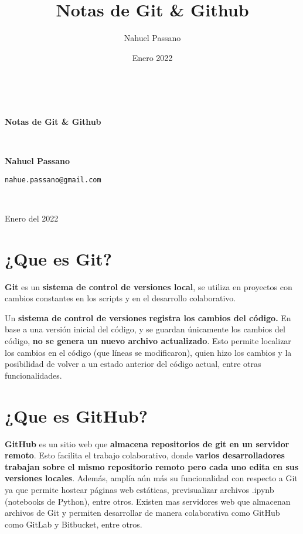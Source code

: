 \documentclass[11pt, twoside]{article}
\title{Notas de Git \& Github}
\author{Nahuel Passano}
\date{Enero 2022}
\begin{document}
\begin{titlepage}
\author{}
\date{}

\centering

~
\vspace{2cm}
~


\vspace{1cm}


\vspace{4cm}
\color{Blue}
{\Huge \bfseries Notas de Git \& Github\par}
\color{Black}
~

{\bfseries\LARGE Nahuel Passano  \par}
{ \texttt{nahue.passano@gmail.com}}

~
\vspace{4cm}
~

\vfill


{\large Enero del 2022\par}
\end{titlepage}
\section{¿Que es Git?}

\textbf{Git} es un \textbf{sistema de control de versiones local}, se utiliza en proyectos con cambios constantes en los scripts y en el desarrollo colaborativo. 

Un \textbf{sistema de control de versiones} \textbf{registra los cambios del código.} En base a una versión inicial del código, y se guardan únicamente los cambios del código, \textbf{no se genera un nuevo archivo actualizado}. Esto permite localizar los cambios en el código (que líneas se modificaron), quien hizo los cambios y la posibilidad de volver a un estado anterior del código actual, entre otras funcionalidades.

\section{¿Que es GitHub?}

\textbf{GitHub} es un sitio web que \textbf{almacena repositorios de git en un servidor remoto}. Esto facilita el trabajo colaborativo, donde \textbf{varios desarrolladores trabajan sobre el mismo repositorio remoto pero cada uno edita en sus versiones locales}. Además, amplía aún más su funcionalidad con respecto a Git ya que permite hostear páginas web estáticas, previsualizar archivos .ipynb (notebooks de Python), entre otros. Existen mas servidores web que almacenan archivos de Git y permiten desarrollar de manera colaborativa como GitHub como GitLab y Bitbucket, entre otros.
\end{document}
